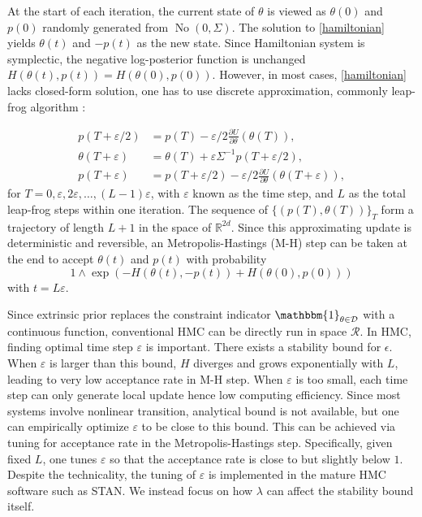 \documentclass[10pt]{article}
\newcommand{\mc}[1]{\mathcal{#1}}
\DeclareMathOperator{\No}{No}
\DeclareMathOperator{\1}{\mathbbm{1}}
\begin{document}
At the start of each iteration, the current state of $\theta$ is viewed as $\theta(0)$ and $p(0)$ randomly generated from $\No(0, \Sigma)$. The solution to \eqref{hamiltonian} yields $\theta(t)$ and $-p(t)$ as the new state. Since Hamiltonian system is symplectic, the negative log-posterior function is unchanged $H(\theta(t),p(t))=H(\theta(0),p(0))$. However, in most cases, \eqref{hamiltonian} lacks closed-form solution, one has to use discrete approximation, commonly leap-frog algorithm \citep{neal2011mcmc}:


\begin{equation}
\begin{aligned}
\label{leap-frog}
p(T+ \varepsilon/2) & = p(T) - \varepsilon/2 \frac{\partial U}{\partial  \theta } ( \theta (T)),\\
 \theta (T + \varepsilon) & =  \theta (T) + \varepsilon \Sigma^{-1}p(T+  \varepsilon/2),\\
p(T+ \varepsilon) &= p(T+ \varepsilon/2) - \varepsilon/2 \frac{\partial U}{\partial  \theta } ( \theta (T + \varepsilon)),
\end{aligned}
\end{equation}
for $T=0,\varepsilon, 2\varepsilon,\ldots, (L-1)\varepsilon$, with $\varepsilon$ known as the time step, and $L$ as the total leap-frog steps within one iteration. The sequence of $\{(p(T),\theta(T))\}_T$ form a trajectory of length $L+1$ in the space of $\mathbb R^{2d}$. Since this approximating update is deterministic and reversible, an Metropolis-Hastings (M-H) step can be taken at the end to accept $\theta(t)$ and $p(t)$ with probability 
$$1\wedge \exp  \left( - H(\theta(t),-p(t)) + H(\theta(0),p(0))\right)$$
 with $t=L\varepsilon$.
 
 
Since extrinsic prior replaces the constraint indicator $\mathbbm{1}_{\theta \in \mc D}$ with a continuous function, conventional HMC can be directly run in space $\mc R$. In HMC, finding optimal time step $\varepsilon$ is important. There exists a stability bound for $\epsilon$. When $\varepsilon$ is larger than this bound, $H$ diverges and grows exponentially with $L$, leading to very low acceptance rate in M-H step. When $\varepsilon$ is too small, each time step can only generate local update hence low computing efficiency. 
Since most systems involve nonlinear transition, analytical bound is not available, but one can empirically optimize $\varepsilon$ to be close to this bound. This can be achieved via tuning for acceptance rate in the Metropolis-Hastings step. Specifically, given fixed $L$, one tunes $\varepsilon$ so that the acceptance rate is close to but slightly below $1$. Despite the technicality, the tuning of $\varepsilon$ is implemented in the mature HMC software such as STAN. We instead focus on how $\lambda$ can affect the stability bound itself.
\end{document}

